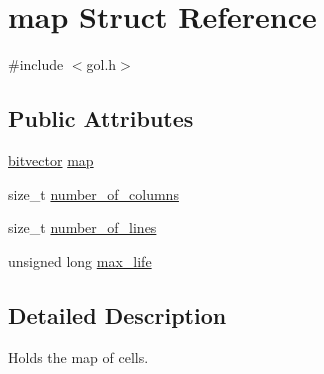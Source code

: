\hypertarget{structmap}{\section{map Struct Reference}
\label{structmap}
}


{\ttfamily \#include $<$gol.\+h$>$}

\subsection*{Public Attributes}
\begin{DoxyCompactItemize}
\item 
\hyperlink{bitvector_8h_a081cb20e110243e7e783b06c7bfce8a0}{bitvector} \hyperlink{structmap_ae9243fe2b84af47008bbca03f017e7a6}{map}
\item 
size\+\_\+t \hyperlink{structmap_a1af4ea8f87e35c094fbc75ef821a4a16}{number\+\_\+of\+\_\+columns}
\item 
size\+\_\+t \hyperlink{structmap_a9dc72549424fad730c80918f48421c4c}{number\+\_\+of\+\_\+lines}
\item 
unsigned long \hyperlink{structmap_a26a700b5989c45db406cf55f861b50c8}{max\+\_\+life}
\end{DoxyCompactItemize}


\subsection{Detailed Description}
Holds the map of cells. 

